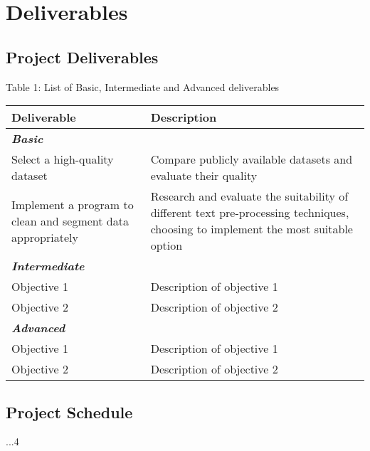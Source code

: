 \documentclass[12pt,a4paper]{article}
\begin{document}
\newpage

\section{Deliverables}
\subsection{Project Deliverables}
\begin{center}
	Table 1: List of Basic, Intermediate and Advanced deliverables
\end{center}
\begin{tabular}{p{5cm}p{10cm}}
	\hline
	\textbf{Deliverable} & \textbf{Description}\\
	\hline\hline
	\multicolumn{2}{l}{\textit{\textbf{Basic}}} \\
	\hline
	Select a high-quality dataset   &  Compare publicly available datasets and evaluate their quality\\
	
	Implement a program to clean and segment data appropriately   & Research and evaluate the suitability of different text pre-processing techniques, choosing to implement the most suitable option\\
	\hline \hline
	\multicolumn{2}{l}{\textit{\textbf{Intermediate}}} \\
	\hline
	Objective 1   &  Description of objective 1\\
	Objective 2   &  Description of objective 2\\
	\hline \hline
	\multicolumn{2}{l}{\textit{\textbf{Advanced}}} \\
	\hline
	Objective 1   &  Description of objective 1\\
	Objective 2   &  Description of objective 2\\
	\hline
\end{tabular}

\subsection{Project Schedule}
...4 

\newpage
\end{document}
